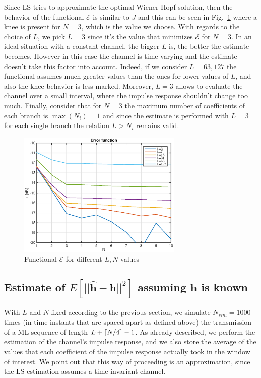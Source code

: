 \documentclass[10pt]{article}
\DeclarePairedDelimiter{\ceil}{\lceil}{\rceil}
\begin{document}
Since LS tries to approximate the optimal Wiener-Hopf solution, then the behavior of the functional $\mathcal{E}$ is similar to $J$ and this can be seen in Fig.~\ref{fig:LN} where a knee is present for $N = 3$, which is the value we choose. With regards to the choice of $L$, we pick $L=3$ since it's the value that minimizes $\mathcal{E}$ for $N=3$. In an ideal situation with a constant channel, the bigger $L$ is, the better the estimate becomes. However in this case the channel is time-varying and the estimate doesn't take this factor into account. Indeed, if we consider $L = 63, 127$ the functional assumes much greater values than the ones for lower values of $L$, and also the knee behavior is less marked. Moreover, $L=3$ allows to evaluate the channel over a small interval, where the impulse response shouldn't change too much. Finally, consider that for $N=3$ the maximum number of coefficients of each branch is $\max(N_i) = 1$ and since the estimate is performed with $L=3$ for each single branch the relation $L > N_i$ remains valid.

\begin{figure}
  \centering
  \includegraphics[width = 0.7\textwidth]{p02_errfunc}
  \caption{Functional $\mathcal{E}$ for different $L, N$ values}
  \label{fig:LN}
\end{figure}



\subsection*{Estimate of $E[||\mathbf{\hat{h}}-\mathbf{h}||^2]$ assuming $\mathbf{h}$ is known}

With $L$ and $N$ fixed according to the previous section, we simulate $N_{sim}=1000$ times (in time instants that are spaced apart as defined above) the transmission of a ML sequence of length $L+\ceil{N/4} - 1$. As already described, we perform the estimation of the channel's impulse response, and we also store the average of the values that each coefficient of the impulse response actually took in the window of interest. We point out that this way of proceeding is an approximation, since the LS estimation assumes a time-invariant channel.
\end{document}
